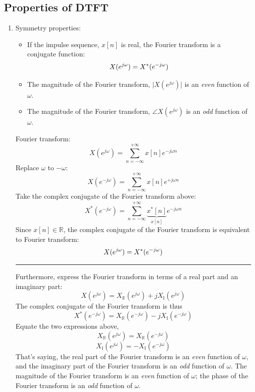 \subsection{Properties of DTFT}
\begin{enumerate}

    \item Symmetry properties: 
    \begin{itemize}
        \item If the impulse sequence, $x[n]$ is real, the Fourier transform is a conjugate function:
        \begin{equation}
            X(e^{j\omega}) = X^{*}(e^{-j\omega})
        \end{equation}

        \item The magnitude of the Fourier transform, $\lvert X(e^{j\omega}) \rvert$ is an \textit{even} function of $\omega$.

        \item The magnitude of the Fourier transform, $\angle X(e^{j\omega})$ is an \textit{odd} function of $\omega$.
    \end{itemize}
    
    \begin{dv}{}
     Fourier transform:
     \[
      X(e^{j\omega}) =  \sum_{n=-\infty}^{+\infty} x[n] e^{-j\omega n}
     \]
     Replace $\omega$ to $-\omega$:
     \[
      X(e^{-j\omega}) =  \sum_{n=-\infty}^{+\infty} x[n] e^{+j\omega n}
     \]
     Take the complex conjugate of the Fourier transform above: 
     \[
      X^{*}(e^{-j\omega}) =  \sum_{n=-\infty}^{+\infty} \underbrace{x^{*}[n]}_{x[n]} e^{-j\omega n}
     \]
     Since $x[n] \in \mathbb{R}$, the complex conjugate of the Fourier transform is equivalent to Fourier transform:
     \[
      X(e^{j\omega}) = X^{*}(e^{-j\omega})
     \]
    \rule{\textwidth}{.1ex}
     Furthermore, express the Fourier transform in terms of a real part and an imaginary part:
     \[
      X(e^{j\omega}) = X_{\mathbb{R}}(e^{j\omega}) + j X_{\mathbb{I}}(e^{j\omega})
     \]
     The complex conjugate of the Fourier transform is thus
     \[
      X^{*}(e^{-j\omega}) = X_{\mathbb{R}}(e^{-j\omega}) - j X_{\mathbb{I}}(e^{-j\omega})
     \]
     Equate the two expressions above, 
     \[
      X_{\mathbb{R}}(e^{j\omega}) = X_{\mathbb{R}}(e^{-j\omega})
     \]
     \[
      X_{\mathbb{I}}(e^{j\omega}) = -X_{\mathbb{I}}(e^{-j\omega})
     \]
     That's saying, the real part of the Fourier transform is an \textit{even} function of $\omega$, and the imaginary part of the Fourier transform is an \textit{odd} function of $\omega$.
    The magnitude of the Fourier transform is an \textit{even} function of $\omega$; the phase of the Fourier transform is an \textit{odd} function of $\omega$.
    \end{dv}
    

\end{enumerate}
